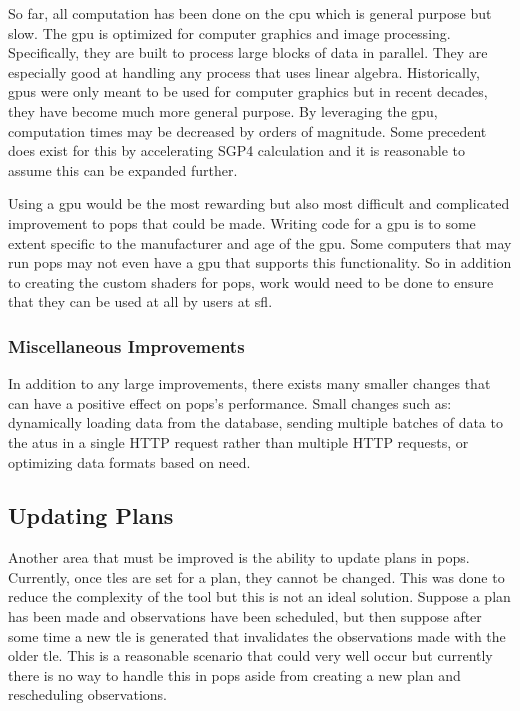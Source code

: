 So far, all computation has been done on the \gls{cpu} which is general purpose
but slow. The \gls{gpu} is optimized for computer graphics and image
processing. Specifically, they are built to process large blocks of data in
parallel. They are especially good at handling any process that uses linear
algebra. Historically, \glspl{gpu} were only meant to be used for computer
graphics but in recent decades, they have become much more general purpose. By
leveraging the \gls{gpu}, computation times may be decreased by orders of
magnitude. Some precedent does exist for this by accelerating SGP4 calculation
\cite{moeckel_high_2016} \cite{fraire_opencl-accelerated_2013} and it is
reasonable to assume this can be expanded further.

Using a \gls{gpu} would be the most rewarding but also most difficult and
complicated improvement to \gls{pops} that could be made. Writing code for a
\gls{gpu} is to some extent specific to the manufacturer and age of the
\gls{gpu}. Some computers that may run \gls{pops} may not even have a \gls{gpu}
that supports this functionality. So in addition to creating the custom shaders
for \gls{pops}, work would need to be done to ensure that they can be used at
all by users at \gls{sfl}.
 

\subsubsection{Miscellaneous Improvements}

In addition to any large improvements, there exists many smaller changes that
can have a positive effect on \gls{pops}'s performance. Small changes such as:
dynamically loading data from the database, sending multiple batches of data to
the \glspl{atu} in a single HTTP request rather than multiple HTTP requests, or
optimizing data formats based on need.


\subsection{Updating Plans}

Another area that must be improved is the ability to update plans in
\gls{pops}. Currently, once \glspl{tle} are set for a plan, they cannot be
changed. This was done to reduce the complexity of the tool but this is not an
ideal solution.  Suppose a plan has been made and observations have been
scheduled, but then suppose after some time a new \gls{tle} is generated that
invalidates the observations made with the older \gls{tle}. This is a
reasonable scenario that could very well occur but currently there is no way to
handle this in \gls{pops} aside from creating a new plan and rescheduling
observations.

